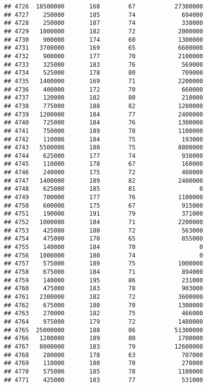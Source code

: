 \documentclass[
]{article}
\begin{document}
\begin{verbatim}
## 4726  18500000       168        67           27300000
## 4727    250000       185        74             694000
## 4728    250000       187        74             338000
## 4729   1000000       182        72            2000000
## 4730    900000       174        60            1300000
## 4731   3700000       169        65            6600000
## 4732    900000       177        70            2100000
## 4733    325000       183        76             569000
## 4734    525000       178        80             709000
## 4735   1400000       169        71            2200000
## 4736    400000       172        70             660000
## 4737    120000       182        80             210000
## 4738    775000       188        82            1200000
## 4739   1200000       184        77            2400000
## 4740    725000       184        76            1300000
## 4741    750000       189        78            1100000
## 4742    110000       184        75             193000
## 4743   5500000       180        75            8800000
## 4744    625000       177        74             938000
## 4745    110000       178        67             160000
## 4746    240000       175        72             408000
## 4747   1400000       189        82            2400000
## 4748    625000       185        81                  0
## 4749    700000       177        76            1100000
## 4750    600000       175        67             915000
## 4751    190000       191        79             371000
## 4752   1000000       184        71            2200000
## 4753    425000       180        72             563000
## 4754    475000       170        65             855000
## 4755    140000       184        70                  0
## 4756   1000000       180        74                  0
## 4757    575000       189        75            1000000
## 4758    675000       184        71             894000
## 4759    140000       195        86             231000
## 4760    475000       183        78             903000
## 4761   2300000       182        72            3600000
## 4762    675000       180        70            1300000
## 4763    270000       182        75             466000
## 4764    975000       179        72            1400000
## 4765  25000000       188        86           51300000
## 4766   1200000       189        80            1700000
## 4767   8000000       183        79           12600000
## 4768    280000       178        63             707000
## 4769    110000       180        70             278000
## 4770    575000       185        78            1100000
## 4771    425000       183        77             531000

\end{verbatim}
\end{document}
